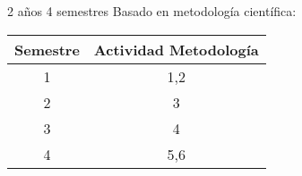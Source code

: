 2 años
	4 semestres
Basado en metodología científica:
\begin{table}[]
\begin{tabular}{|c|c|}\hline
Semestre & Actividad Metodología \\\hline\hline
1        & 1,2                   \\\hline
2        & 3                     \\\hline
3        & 4                     \\\hline
4        & 5,6\\\hline
\end{tabular}
\end{table}